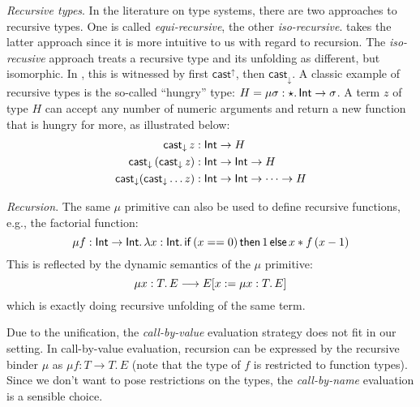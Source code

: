 \emph{Recursive types}. In the literature on type systems, there are two approaches to recursive types. One is called \emph{equi-recursive}, the other \emph{iso-recursive}. \name takes the latter approach since it is more intuitive to us with regard to recursion. The \emph{iso-recusive} approach treats a recursive type and its unfolding as different, but isomorphic. In \name, this is witnessed by first $ \mathsf{cast}^{\uparrow} $, then $ \mathsf{cast}_{\downarrow} $. A classic example of recursive types is the so-called ``hungry'' type: $H = \mu \sigma:\star.\,\mathsf{Int} \rightarrow \sigma$. A term $z$ of type $H$ can accept any number of numeric arguments and return a new function that is hungry for more, as illustrated below:
\begin{align*}
\mathsf{cast}_{\downarrow} \, \mathit{z} &:  \mathsf{Int}  \rightarrow H  \\
\mathsf{cast}_{\downarrow} \, (  \mathsf{cast}_{\downarrow} \, \mathit{z}  ) &:  \mathsf{Int}  \rightarrow  \mathsf{Int}  \rightarrow H \\
 \mathsf{cast}_{\downarrow} ( \mathsf{cast}_{\downarrow}  \dots z) &:  \mathsf{Int}  \rightarrow  \mathsf{Int}  \rightarrow \dots \rightarrow H
\end{align*}

\emph{Recursion}. The same $\mu$ primitive can also be used to define recursive functions, e.g., the factorial function: \[\mu f:\mathsf{Int} \rightarrow \mathsf{Int}.\,\lambda x:\mathsf{Int}.\,\mathsf{if}\,(x == 0)\,\mathsf{then}\,1\,\mathsf{else}\,x * f\,(x - 1)\] This is reflected by the dynamic semantics of the $\mu$ primitive:
\[\mu x:T.\,E \longrightarrow E[x:=\mu x:T.\,E]\]
which is exactly doing recursive unfolding of the same term.

Due to the unification, the \emph{call-by-value} evaluation strategy does not fit in our setting. In call-by-value evaluation, recursion can be expressed by the recursive binder $\mu$ as $\mu f : T \rightarrow T.\, E$ (note that the type of $f$ is restricted to function types). Since we don't want to pose restrictions on the types, the \emph{call-by-name}  evaluation is a sensible choice.


